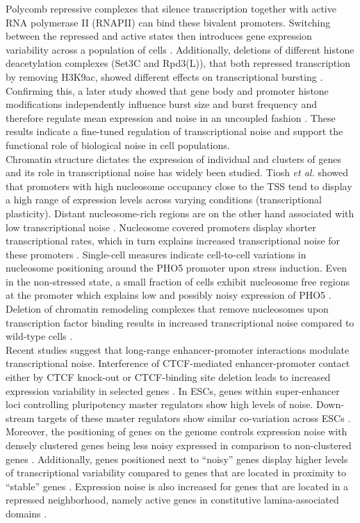 Polycomb repressive complexes that silence transcription together with active RNA polymerase II (RNAPII) can bind these bivalent promoters. Switching between the repressed and active states then introduces gene expression variability across a population of cells \cite{Kar2017}. Additionally, deletions of different histone deacetylation complexes (Set3C and Rpd3(L)), that both repressed transcription by removing H3K9ac, showed different effects on transcriptional bursting \citep{Weinberger2012}.  Confirming this, a later study showed that gene body and promoter histone modifications independently influence burst size and burst frequency and therefore regulate mean expression and noise in an uncoupled fashion \cite{Wu2017}. These results indicate a fine-tuned regulation of transcriptional noise and support the functional role of biological noise in cell populations.\\
Chromatin structure dictates the expression of individual and clusters of genes and its role in transcriptional noise has widely been studied. Tiosh \textit{et al.} showed that promoters with high nucleosome occupancy close to the TSS tend to display a high range of expression levels across varying conditions (transcriptional plasticity). Distant nucleosome-rich regions are on the other hand associated with low transcriptional noise \citep{Tirosh2008}. Nucleosome covered promoters display shorter transcriptional rates, which in turn explains increased transcriptional noise for these promoters \cite{Dey2015}. Single-cell measures indicate cell-to-cell variations in nucleosome positioning around the PHO5 promoter upon stress induction. Even in the non-stressed state, a small fraction of cells exhibit nucleosome free regions at the promoter which explains low and possibly noisy expression of PHO5 \citep{Small2014}. Deletion of chromatin remodeling complexes that remove nucleosomes upon transcription factor binding results in increased transcriptional noise compared to wild-type cells \citep{Raser2004}. \\ 
Recent studies suggest that long-range enhancer-promoter interactions modulate transcriptional noise. Interference of CTCF-mediated enhancer-promoter contact either by CTCF knock-out or CTCF-binding site deletion leads to increased expression variability in selected genes \citep{Ren2017}. In ESCs, genes within super-enhancer loci controlling pluripotency master regulators show high levels of noise. Down-stream targets of these master regulators show similar co-variation across ESCs \citep{Faure2017}.\\
Moreover, the positioning of genes on the genome controls expression noise with densely clustered genes being less noisy expressed in comparison to non-clustered genes \citep{Kustatscher2017}. Additionally, genes positioned next to “noisy” genes display higher levels of transcriptional variability compared to genes that are located in proximity to “stable” genes \citep{Kar2017}. Expression noise is also increased for genes that are located in a repressed neighborhood, namely active genes in constitutive lamina-associated domains \citep{Faure2017}. 

